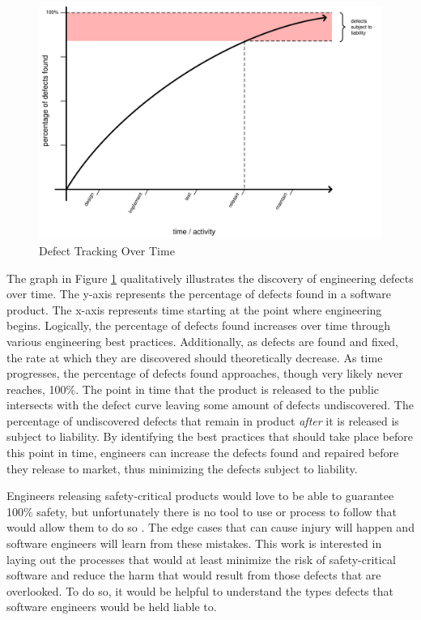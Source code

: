 \documentclass[12pt]{report}
\begin{document}
\begin{figure}[t] 
\begin{center} 
\includegraphics[scale=0.77]{figures/graph.pdf} 
\end{center} 
\caption{Defect Tracking Over Time} 
\label{fig:bugs} 
\end{figure} 

The graph in Figure \ref{fig:bugs} qualitatively illustrates the discovery of engineering defects over time. The y-axis represents the percentage of defects found in a software product. The x-axis represents time starting at the point where engineering begins. Logically, the percentage of defects found increases over time through various engineering best practices. Additionally, as defects are found and fixed, the rate at which they are discovered should theoretically decrease. As time progresses, the percentage of defects found approaches, though very likely never reaches, 100\%. The point in time that the product is released to the public intersects with the defect curve leaving some amount of defects undiscovered. The percentage of undiscovered defects that remain in product \textit{after} it is released is subject to liability. By identifying the best practices that should take place before this point in time, engineers can increase the defects found and repaired before they release to market, thus minimizing the defects subject to liability.

Engineers releasing safety-critical products would love to be able to guarantee 100\% safety, but unfortunately there is no tool to use or process to follow that would allow them to do so \cite{Brooks87}. The edge cases that can cause injury will happen and software engineers will learn from these mistakes. This work is interested in laying out the processes that would at least minimize the risk of safety-critical software and reduce the harm that would result from those defects that are overlooked. To do so, it would be helpful to understand the types defects that software engineers would be held liable to.
\end{document}
